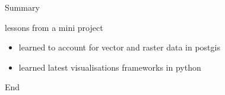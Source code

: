 \documentclass[ucs,9pt]{beamer}
\begin{document}
\begin{frame}{Summary}
	\begin{block}{lessons from a mini project}
			\begin{itemize}
				\item learned to account for vector and raster data in postgis
				\item learned latest visualisations frameworks in python
			\end{itemize}
	\end{block}
\end{frame}

\begin{frame}{End}
  \\
  \\
\end{frame}
\end{document}
